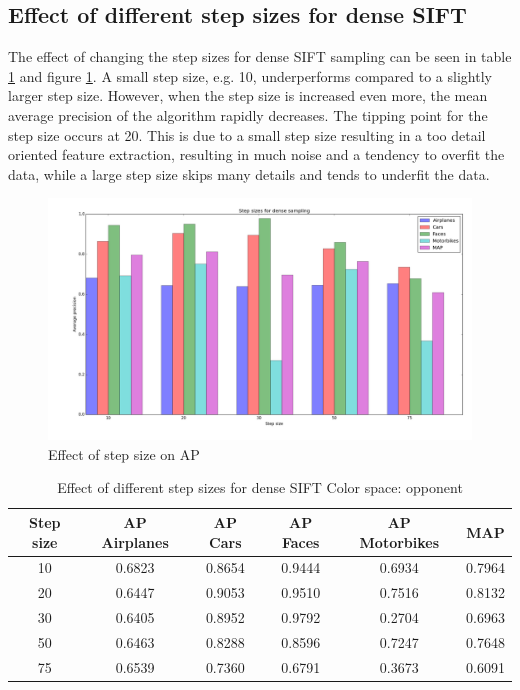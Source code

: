 \subsection{Effect of different step sizes for dense SIFT}
The effect of changing the step sizes for dense SIFT sampling can be seen in table \ref{tab:stepsize} and figure \ref{plot:stepsize}. A small step size, e.g. 10, underperforms compared to a slightly larger step size. However, when the step size is increased even more, the mean average precision of the algorithm rapidly decreases. The tipping point for the step size occurs at 20. This is due to a small step size resulting in a too detail oriented feature extraction, resulting in much noise and a tendency to overfit the data, while a large step size skips many details and tends to underfit the data. 

\begin{figure}[H]
\includegraphics[width=\textwidth]{../plots/step_sizes_dense_sampling}
\caption{Effect of step size on AP}
\label{plot:stepsize}
\end{figure}
\begin{table}[H]
\begin{center}
\begin{tabular}{|c|ccccc|}
\hline
\textbf{Step size} & \textbf{AP Airplanes} & \textbf{AP Cars} & \textbf{AP Faces} & \textbf{AP Motorbikes} & \textbf{MAP}\\
\hline
10 & 0.6823 & 0.8654 & 0.9444 & 0.6934 & 0.7964\\
20 & 0.6447 & 0.9053 & 0.9510 & 0.7516 & 0.8132\\
30 & 0.6405 &  0.8952& 0.9792& 0.2704 & 0.6963\\
50 & 0.6463 & 0.8288 & 0.8596 & 0.7247 & 0.7648\\
75 & 0.6539 & 0.7360 & 0.6791 & 0.3673 & 0.6091\\
\hline
\end{tabular}
\caption{Effect of different step sizes for dense SIFT Color space: opponent}
\label{tab:stepsize}
\end{center}
\end{table}